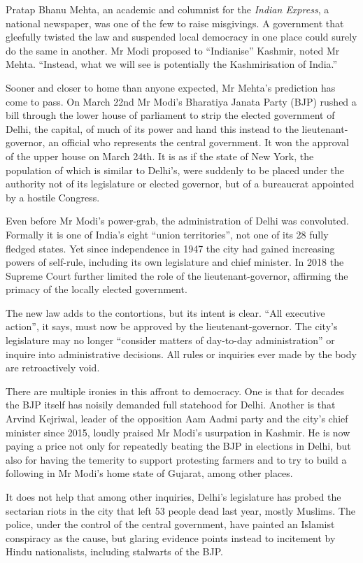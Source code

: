 \documentclass{article}
\begin{document}
Pratap Bhanu Mehta, an academic and columnist for the \emph{Indian Express}, a national newspaper, was one of the few to raise misgivings. A government that gleefully twisted the law and suspended local democracy in one place could surely do the same in another. Mr Modi proposed to ``Indianise'' Kashmir, noted Mr Mehta. ``Instead, what we will see is potentially the Kashmirisation of India.'' 

Sooner and closer to home than anyone expected, Mr Mehta's prediction has come to pass. On March 22nd Mr Modi's Bharatiya Janata Party (BJP) rushed a bill through the lower house of parliament to strip the elected government of Delhi, the capital, of much of its power and hand this instead to the lieutenant-governor, an official who represents the central government. It won the approval of the upper house on March 24th. It is as if the state of New York, the population of which is similar to Delhi's, were suddenly to be placed under the authority not of its legislature or elected governor, but of a bureaucrat appointed by a hostile Congress. 

Even before Mr Modi's power-grab, the administration of Delhi was convoluted. Formally it is one of India's eight ``union territories'', not one of its 28 fully fledged states. Yet since independence in 1947 the city had gained increasing powers of self-rule, including its own legislature and chief minister. In 2018 the Supreme Court further limited the role of the lieutenant-governor, affirming the primacy of the locally elected government. 

The new law adds to the contortions, but its intent is clear. ``All executive action'', it says, must now be approved by the lieutenant-governor. The city's legislature may no longer ``consider matters of day-to-day administration'' or inquire into administrative decisions. All rules or inquiries ever made by the body are retroactively void. 

There are multiple ironies in this affront to democracy. One is that for decades the BJP itself has noisily demanded full statehood for Delhi. Another is that Arvind Kejriwal, leader of the opposition Aam Aadmi party and the city's chief minister since 2015, loudly praised Mr Modi's usurpation in Kashmir. He is now paying a price not only for repeatedly beating the BJP in elections in Delhi, but also for having the temerity to support protesting farmers and to try to build a following in Mr Modi's home state of Gujarat, among other places. 

It does not help that among other inquiries, Delhi's legislature has probed the sectarian riots in the city that left 53 people dead last year, mostly Muslims. The police, under the control of the central government, have painted an Islamist conspiracy as the cause, but glaring evidence points instead to incitement by Hindu nationalists, including stalwarts of the BJP. 
\end{document}
